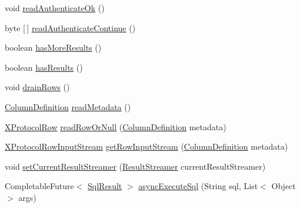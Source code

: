 \begin{DoxyCompactItemize}
\item 
void \mbox{\hyperlink{classcom_1_1mysql_1_1cj_1_1protocol_1_1x_1_1_x_protocol_a1bfbbcb00ef755d4a730dcfa8ff86c22}{read\+Authenticate\+Ok}} ()
\item 
byte \mbox{[}$\,$\mbox{]} \mbox{\hyperlink{classcom_1_1mysql_1_1cj_1_1protocol_1_1x_1_1_x_protocol_ab402e6c132d96495930a05ff1b6d0509}{read\+Authenticate\+Continue}} ()
\item 
boolean \mbox{\hyperlink{classcom_1_1mysql_1_1cj_1_1protocol_1_1x_1_1_x_protocol_acb630c0151e27daa43935309af694864}{has\+More\+Results}} ()
\item 
boolean \mbox{\hyperlink{classcom_1_1mysql_1_1cj_1_1protocol_1_1x_1_1_x_protocol_a11d01b9ba055ec227b3c34dfb2936653}{has\+Results}} ()
\item 
void \mbox{\hyperlink{classcom_1_1mysql_1_1cj_1_1protocol_1_1x_1_1_x_protocol_a5b176c1f316754287198955a224c24f5}{drain\+Rows}} ()
\item 
\mbox{\hyperlink{interfacecom_1_1mysql_1_1cj_1_1protocol_1_1_column_definition}{Column\+Definition}} \mbox{\hyperlink{classcom_1_1mysql_1_1cj_1_1protocol_1_1x_1_1_x_protocol_a99e20fc57fa97bd0a490d9cfe725e2fa}{read\+Metadata}} ()
\item 
\mbox{\hyperlink{classcom_1_1mysql_1_1cj_1_1protocol_1_1x_1_1_x_protocol_row}{X\+Protocol\+Row}} \mbox{\hyperlink{classcom_1_1mysql_1_1cj_1_1protocol_1_1x_1_1_x_protocol_a44138b083a297b9a430e696b3952b52f}{read\+Row\+Or\+Null}} (\mbox{\hyperlink{interfacecom_1_1mysql_1_1cj_1_1protocol_1_1_column_definition}{Column\+Definition}} metadata)
\item 
\mbox{\hyperlink{classcom_1_1mysql_1_1cj_1_1protocol_1_1x_1_1_x_protocol_row_input_stream}{X\+Protocol\+Row\+Input\+Stream}} \mbox{\hyperlink{classcom_1_1mysql_1_1cj_1_1protocol_1_1x_1_1_x_protocol_a42d0005d5123c6c54913d499ab69fbf5}{get\+Row\+Input\+Stream}} (\mbox{\hyperlink{interfacecom_1_1mysql_1_1cj_1_1protocol_1_1_column_definition}{Column\+Definition}} metadata)
\item 
void \mbox{\hyperlink{classcom_1_1mysql_1_1cj_1_1protocol_1_1x_1_1_x_protocol_a5d594bb0ea3ed519640a02cbdd74a165}{set\+Current\+Result\+Streamer}} (\mbox{\hyperlink{interfacecom_1_1mysql_1_1cj_1_1protocol_1_1_result_streamer}{Result\+Streamer}} current\+Result\+Streamer)
\item 
Completable\+Future$<$ \mbox{\hyperlink{interfacecom_1_1mysql_1_1cj_1_1xdevapi_1_1_sql_result}{Sql\+Result}} $>$ \mbox{\hyperlink{classcom_1_1mysql_1_1cj_1_1protocol_1_1x_1_1_x_protocol_ad350915d27a3da6c81f1390ce25097ac}{async\+Execute\+Sql}} (String sql, List$<$ Object $>$ args)

\end{DoxyCompactItemize}
